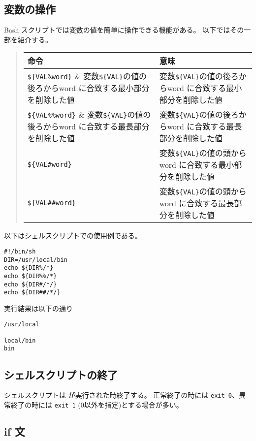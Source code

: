 \documentclass{jreport}
\begin{document}
\subsection{変数の操作}

Bash スクリプトでは変数の値を簡単に操作できる機能がある。
以下ではその一部を紹介する。

\index{\$\{\%\}}
\index{\$\{\%\%\}}
\index{\$\{\#\}}
\index{\$\{\#\#\}}
\begin{quote}
\begin{tabular}[t]{lp{10cm}} \hline
命令 & 意味 \\ \hline
\verb|${VAL%word}| & 変数\verb|${VAL}|の値の後ろからword に合致する最小部分を削除した値\\
\verb|${VAL%%word}| & 変数\verb|${VAL}|の値の後ろからword に合致する最長部分を削除した値\\
\verb|${VAL#word}| & 変数\verb|${VAL}|の値の頭からword に合致する最小部分を削除した値\\
\verb|${VAL##word}| & 変数\verb|${VAL}|の値の頭からword に合致する最長部分を削除した値\\
\hline
\end{tabular}
\end{quote}

以下はシェルスクリプトでの使用例である。
\begin{screen}
\begin{verbatim}
#!/bin/sh
DIR=/usr/local/bin
echo ${DIR%/*}
echo ${DIR%%/*}
echo ${DIR#/*/}
echo ${DIR##/*/}
\end{verbatim}
\end{screen}
実行結果は以下の通り
\begin{screen}
\begin{verbatim}
/usr/local

local/bin
bin
\end{verbatim}
\end{screen}


\subsection{シェルスクリプトの終了}

シェルスクリプトは
が実行された時終了する。
正常終了の時には \verb|exit 0|、異常終了の時には
\verb|exit 1| (0以外を指定)とする場合が多い。

\subsection{if 文}
\end{document}
